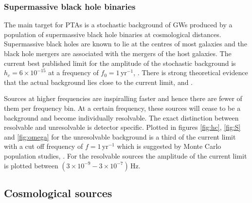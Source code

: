\subsubsection{Supermassive black hole binaries}
The main target for PTAs is a stochastic background of GWs produced by a population of supermassive black hole binaries at cosmological distances. Supermassive black holes are known to lie at the centres of most galaxies and the black hole mergers are associated with the mergers of the host galaxies. The current best published limit for the amplitude of the stochastic background is $h_{c}=6\times 10^{-15}$ at a frequency of $f_{0}=1\,\textrm{yr}^{-1}$, \cite{Haasteren}. There is strong theoretical evidence that the actual background lies close to the current limit, \cite{imminentdetectionofgravitationalwaves} and \cite{Sesana-2012}. 

Sources at higher frequencies are inspiralling faster and hence there are fewer of them per frequency bin. At a certain frequency, these sources will cease to be a background and become individually resolvable. The exact distinction between resolvable and unresolvable is detector specific. Plotted in figures \ref{fig:hc}, \ref{fig:S} and \ref{fig:omega} for the unresolvable background is a third of the current limit with a cut off frequency of $f=1\,\textrm{yr}^{-1}$ which is suggested by Monte Carlo population studies, \cite{SesanaVecchioColancino}. For the resolvable sources the amplitude of the current limit is plotted between $\left(3\times 10^{-9} - 3\times 10^{-7}\right)\,\textrm{Hz}$.




\subsection{Cosmological sources}
